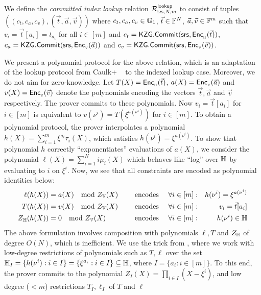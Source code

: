 \begin{definition}\label{defn:comm-index-lookup}
We define the {\em committed index lookup} relation $\mathcal{R}^{\mathsf{lookup}}_{\mathsf{srs},N,m}$ to consist of tuples
$((c_t,c_a,c_v),(\vec{t},\vec{a},\vec{v}))$ where $c_t,c_a,c_v\in \mathbb{G}_1$, $\vec{t}\in \mathbb{F}^N$, $\vec{a},\vec{v}\in \mathbb{F}^m$ such
that $v_i = \vec{t}[a_i]=t_{a_i}$ for all $i\in [m]$ and $c_t = \mathsf{KZG.Commit}(\mathsf{srs}, \mathsf{Enc}_{{}_{\mathbb{H}}}(\vec{t}))$, $c_a=\mathsf{KZG.Commit}(\mathsf{srs},\mathsf{Enc}_{{}_{\mathbb{V}}}(\vec{a}))$
and $c_v=\mathsf{KZG.Commit}(\mathsf{srs},\mathsf{Enc}_{{}_{\mathbb{V}}}(\vec{v}))$.
\end{definition}

We present a polynomial protocol for the above relation, which is an adaptation of the lookup protocol from Caulk+ ~\cite{EPRINT:PosKat22}
to the indexed lookup case. Moreover, we do not aim for zero-knowledge. Let $T(X)=\mathsf{Enc}_{{}_{\mathbb{H}}}(\vec{t})$, $a(X)=\mathsf{Enc}_{{}_{\mathbb{V}}}(\vec{a})$ and
$v(X)=\mathsf{Enc}_{{}_{\mathbb{V}}}(\vec{v})$ denote the polynomials encoding the vectors $\vec{t},\vec{a}$ and $\vec{v}$ respectively. The prover commits
to these polynomials. Now $v_i = \vec{t}[a_i]$ for $i\in [m]$ is equivalent to $v(\nu^i) = T(\xi^{a(\nu^i)})$ for $i\in [m]$. To
obtain a polynomial protocol, the prover interpolates a polynomial $h(X)=\sum_{i=1}^m \xi^{a_i}\tau_i(X)$, which satisfies
$h(\nu^i)=\xi^{a(\nu^i)}$. To show that polynomial $h$ correctly ``exponentiates'' evaluations of $a(X)$, we consider the
polynomial $\ell(X)=\sum_{i=1}^N i\mu_i(X)$ which behaves like ``log'' over $\mathbb{H}$ by evaluating to $i$ on $\xi^i$. Now, we see
that all constraints are encoded as polynomial identities below:
\begin{alignat}{3}
\ell(h(X)) &= a(X) \quad \text{mod } Z_{\mathbb{V}}(X) & \quad\text{ encodes } & \quad \forall i\in [m]:& h(\nu^i) = \xi^{a(\nu^i)}  \\
T(h(X)) &= v(X) \quad \text{mod } Z_{\mathbb{V}}(X) & \quad\text{ encodes } & \quad \forall i\in [m]:& v_i = \vec{t}[a_i] \\
Z_{\mathbb{H}}(h(X)) &= 0 \quad \text{mod } Z_{\mathbb{V}}(X)  &\quad\text{ encodes } & \quad \forall i \in [m]:& h(\nu^i)\in \mathbb{H}
\end{alignat}
The above formulation involves composition with polynomials $\ell,T$ and $Z_\mathbb{H}$ of degree $O(N)$, which is inefficient. We use the trick from
\cite{EPRINT:PosKat22}, where we work with low-degree restrictions of polynomials such as $T, \ell$ over the set
$\mathbb{H}_I=\{{h(\nu^i)}: i\in I\}=\{\xi^{a_i}:i\in I\}\subseteq \mathbb{H}$, where $I=\{a_i: i\in [m]\}$. To this end, the prover
commits to the polynomial $Z_I(X)=\prod_{i\in I}(X-\xi^i)$, and low degree ($<m$) restrictions $T_I, \ell_I$ of $T$ and $\ell$
